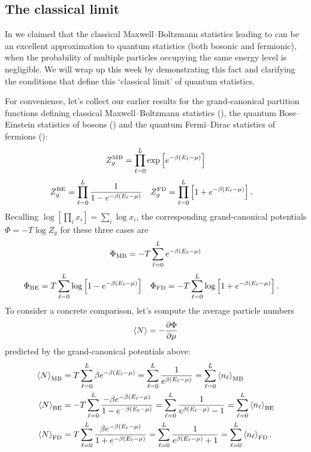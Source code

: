 \subsection{The classical limit}
In  we claimed that the classical Maxwell--Boltzmann statistics leading to  can be an excellent approximation to quantum statistics (both bosonic and fermionic), when the probability of multiple particles occupying the same energy level is negligible.
We will wrap up this week by demonstrating this fact and clarifying the conditions that define this `classical limit' of quantum statistics.

For convenience, let's collect our earlier results for the grand-canonical partition functions defining classical Maxwell--Boltzmann statistics (), the quantum Bose--Einstein statistics of bosons () and the quantum Fermi--Dirac statistics of fermions ():
\begin{equation*}
  Z_g^{\text{MB}} = \prod_{\ell = 0}^L \exp\left[e^{-\beta\left(E_{\ell} - \mu\right)}\right]
\end{equation*}
\begin{align*}
  Z_g^{\text{BE}} & = \prod_{\ell = 0}^L \frac{1}{1 - e^{-\beta (E_{\ell} - \mu)}} &
  Z_g^{\text{FD}} & = \prod_{\ell = 0}^L \left[1 + e^{-\beta (E_{\ell} - \mu)}\right].
\end{align*}
Recalling $\log\left[\prod_i x_i\right] = \sum_i \log x_i$, the corresponding grand-canonical potentials $\Phi = -T \log Z_g$ for these three cases are
\begin{equation*}
  \Phi_{\text{MB}} = -T \sum_{\ell = 0}^L e^{-\beta\left(E_{\ell} - \mu\right)}
\end{equation*}
\begin{align*}
  \Phi_{\text{BE}} & =  T \sum_{\ell = 0}^L \log\left[1 - e^{-\beta (E_{\ell} - \mu)}\right] &
  \Phi_{\text{FD}} & = -T \sum_{\ell = 0}^L \log\left[1 + e^{-\beta (E_{\ell} - \mu)}\right].
\end{align*}
\newpage %
\noindent To consider a concrete comparison, let's compute the average particle numbers
\begin{equation*}
  \left\langle N \right\rangle = -\frac{\partial \Phi}{\partial \mu}
\end{equation*}
predicted by the grand-canonical potentials above:
\begin{align*}
  \left\langle N \right\rangle_{\text{MB}} & =  T \sum_{\ell = 0}^L \beta e^{-\beta\left(E_{\ell} - \mu\right)} = \sum_{\ell = 0}^L \frac{1}{e^{\beta (E_{\ell} - \mu)}} = \sum_{\ell = 0}^L \left\langle n_{\ell} \right\rangle_{\text{MB}} \\
  \left\langle N \right\rangle_{\text{BE}} & = -T \sum_{\ell = 0}^L \frac{-\beta e^{-\beta (E_{\ell} - \mu)}}{1 - e^{-\beta (E_{\ell} - \mu)}} = \sum_{\ell = 0}^L \frac{1}{e^{\beta (E_{\ell} - \mu)} - 1} = \sum_{\ell = 0}^L \left\langle n_{\ell} \right\rangle_{\text{BE}} \\
  \left\langle N \right\rangle_{\text{FD}} & =  T \sum_{\ell = 0}^L \frac{\beta e^{-\beta (E_{\ell} - \mu)}}{1 + e^{-\beta (E_{\ell} - \mu)}} = \sum_{\ell = 0}^L \frac{1}{e^{\beta (E_{\ell} - \mu)} + 1} = \sum_{\ell = 0}^L \left\langle n_{\ell} \right\rangle_{\text{FD}}.
\end{align*}
